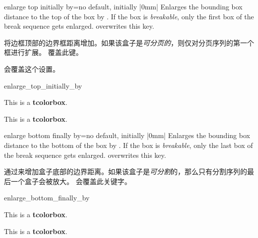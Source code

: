 \begin{docTcbKey}{enlarge top initially by}{=}{no default, initially |0mm|}
Enlarges the bounding box distance to the top of the box by .
If the box is \emph{breakable}, only the first box of the break sequence
gets enlarged.  overwrites this key.

将边框顶部的边界框距离增加。如果该盒子是\emph{可分页的}，则仅对分页序列的第一个框进行扩展。  覆盖此键。 

 会覆盖这个设置。
\begin{exdispExample}{enlarge_top_initially_by}

\begin{tcolorbox}[enlarge top initially by=-5mm]
This is a \textbf{tcolorbox}.
\end{tcolorbox}
\begin{tcolorbox}[enlarge top initially by=5mm,enhanced,show bounding box]
This is a \textbf{tcolorbox}.
\end{tcolorbox}
\end{exdispExample}
\end{docTcbKey}





\begin{docTcbKey}{enlarge bottom finally by}{=}{no default, initially |0mm|}
Enlarges the bounding box distance to the bottom of the box by .
If the box is \emph{breakable}, only the last box of the break sequence
gets enlarged.  overwrites this key.

通过来增加盒子底部的边界距离。如果该盒子是\emph{可分割}的，那么只有分割序列的最后一个盒子会被放大。  会覆盖此关键字。

\begin{exdispExample}{enlarge_bottom_finally_by}

\begin{tcolorbox}[enlarge bottom finally by=5mm]
This is a \textbf{tcolorbox}.
\end{tcolorbox}
\begin{tcolorbox}[enlarge bottom finally by=-5mm,enhanced,show bounding box]
This is a \textbf{tcolorbox}.
\end{tcolorbox}
\end{exdispExample}
\end{docTcbKey}

